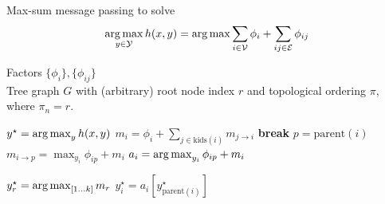 \begin{algorithm} 
\caption[max-sum inference]{Max-sum message passing to solve 
$$\mathop{\arg\max}_{y \in \mathcal{Y}} h(x,y) = \mathop{\arg\max} \sum_{i \in \mathcal{V}} \phi_i + \sum_{ij \in \mathcal{E}} \phi_{ij}$$} 
\label{alg:max-inference} 
\begin{algorithmic} 

\REQUIRE $ $ \\ 
Factors $\{\phi_i\}, \{\phi_{ij}\}$\\
Tree graph $G$ with (arbitrary) root node index $r$ and topological ordering $\pi$, where $\pi_n = r$.

\ENSURE $y^\star = \mathop{\arg\max}_{y} h(x,y)$ 
\STATE
$m_i = \phi_i + \sum_{j \in \text{kids}(i)} m_{j \rightarrow i}$
 \STATE \textbf{break} \ENDIF
\STATE
$p = \text{parent}(i) $
\STATE
$m_{i \rightarrow p} = \max_{y_i} \phi_{ip} + m_i$
\STATE
$a_i = \mathop{\arg\max}_{y_i} \phi_{ip} + m_i$
\ENDFOR

\STATE
$y^\star_r = \mathop{\arg\max}_{[1 \ldots k]} m_r$
\STATE 
$y^\star_i = a_i\left[y^\star_{\text{parent}(i)}\right]$
\ENDFOR

\end{algorithmic} 
\end{algorithm}

